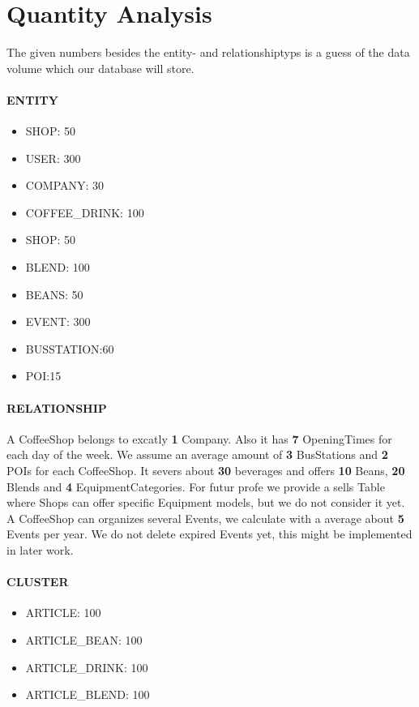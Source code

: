 \section{Quantity Analysis}
The given numbers besides the entity- and relationshiptyps is a guess of the data volume which our database will store.
\paragraph{ENTITY}
\begin{itemize}
\item SHOP: 50
\item USER: 300
\item COMPANY: 30
\item COFFEE\_DRINK: 100
\item SHOP: 50
\item BLEND: 100
\item BEANS: 50
\item EVENT: 300
\item BUSSTATION:60
\item POI:15

\end{itemize}



\paragraph{RELATIONSHIP}
A CoffeeShop belongs to excatly \textbf{1} Company. Also it has \textbf{7} OpeningTimes for each day of the week. We assume an average amount of \textbf{3} BusStations and \textbf{2} POIs for each CoffeeShop. It severs about \textbf{30} beverages and offers \textbf{10} Beans, \textbf{20} Blends and \textbf{4} EquipmentCategories. For futur profe we provide a sells Table where Shops can offer specific Equipment models, but we do not consider it yet.\\
A CoffeeShop can organizes several Events, we calculate with a average about \textbf{5} Events per year. We do not delete expired Events yet, this might be implemented in later work.
 


\paragraph{CLUSTER}
\begin{itemize}
\item ARTICLE: 100
\item ARTICLE\_BEAN: 100
\item ARTICLE\_DRINK: 100
\item ARTICLE\_BLEND: 100
\end{itemize}

